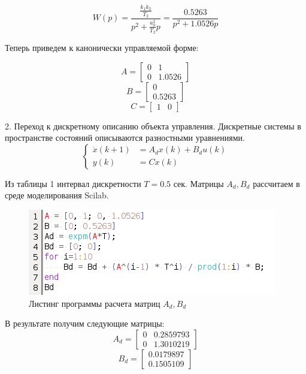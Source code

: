 \documentclass[a4paper,14pt]{extreport}
\begin{document}
	\begin{equation}
	W(p) = \frac{\frac{k_1 k_2}{T_2}}{p^2 + \frac{a_0^2}{T_2} p} = \frac{0.5263}{p^2 + 1.0526  p} 
	\end{equation}
	
	Теперь приведем к канонически управляемой форме:
	
	\begin{equation}
	A=
	\begin{bmatrix}
	0&1\\
	0& 1.0526
	\end{bmatrix}
	\end{equation}
	\begin{equation}
	B=
	\begin{bmatrix}
	0\\
	0.5263
	\end{bmatrix}
	\end{equation}
	\begin{equation}
	C=
	\begin{bmatrix}
	1&0
	\end{bmatrix}
	\end{equation}
	
	2. Переход к дискретному описанию объекта управления.
	Дискретные системы в пространстве состояний описываются разностными уравнениями.
	\begin{equation}
	\begin{cases}
	\dot x(k+1) &= A_d x(k) + B_d u(k)\\
	y(k) &= C x(k)
	\end{cases}
	\end{equation}
	
	Из таблицы 1 интервал дискретности $T = 0.5$ сек.
	Матрицы $A_d, B_d$ рассчитаем в среде моделирования Scilab.
	\begin{figure}[H]
		\center\includegraphics[width=0.5\linewidth]{adbd.png}
		\caption{Листинг программы расчета матриц $A_d, B_d$}
		\label{fig:scr1}
	\end{figure}
	В результате получим следующие матрицы:
	\begin{equation}
	A_d=
	\begin{bmatrix}
	0&0.2859793\\
	0& 1.3010219
	\end{bmatrix}
	\end{equation}
	\begin{equation}
	B_d=
	\begin{bmatrix}
	0.0179897\\
	0.1505109
	\end{bmatrix}
	\end{equation}
	
\end{document}
